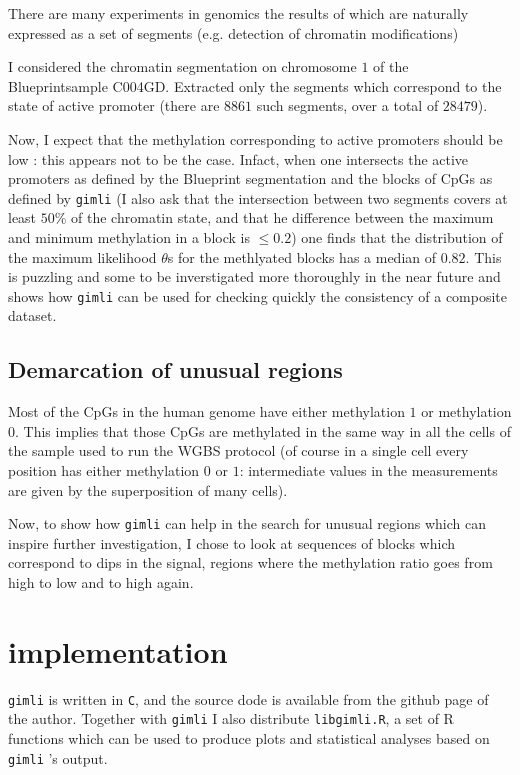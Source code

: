 \documentclass[11pt]{amsart}
\newcommand{\gimli}{\texttt{gimli} }
\begin{document}
There are many experiments in genomics the results of which are naturally 
expressed as a set of segments (e.g. detection of chromatin modifications)

I considered the chromatin segmentation on chromosome $1$ of the
Blueprintsample C004GD. Extracted only the segments which correspond
to the state of active promoter (there are $8861$ such segments, over a total
of $28479$).

Now, I expect that the methylation corresponding to active promoters should be
low : this appears not to be the case. Infact, when one intersects the active
promoters as defined by the Blueprint segmentation and the blocks of CpGs as 
defined by \gimli (I also ask that the intersection between two segments covers
at least $50\%$ of the chromatin state, and that he difference between
the maximum and minimum methylation in a block is $\leq 0.2$) one finds
that the distribution of the maximum likelihood $\theta$s for the 
methlyated blocks has a median of $0.82$. This is puzzling and some 
to be inverstigated more thoroughly in the near future and shows how \gimli
can be used for checking quickly the consistency of a composite dataset.

\subsection{Demarcation of unusual regions} 

Most of the CpGs in the human genome have either methylation $1$ or
methylation $0$. This implies that those CpGs are methylated in the same
way in all the cells of the sample used to run the WGBS protocol
(of course in a single cell every position has either methylation $0$ or $1$:
intermediate values in the measurements are given by the superposition of 
many cells).

Now, to show how \gimli can help in the search for unusual regions which
can inspire further investigation, I chose to look at sequences of blocks 
which correspond to dips in the signal, regions where the methylation
ratio goes from high to low and to high again.

\section{implementation}

\gimli is written in \texttt{C}, and the source
dode is available from the github page of the author. Together
with \gimli I also distribute \texttt{libgimli.R},
a set of R functions which can be used to produce plots and statistical
analyses based on \gimli's output.


\end{document}
